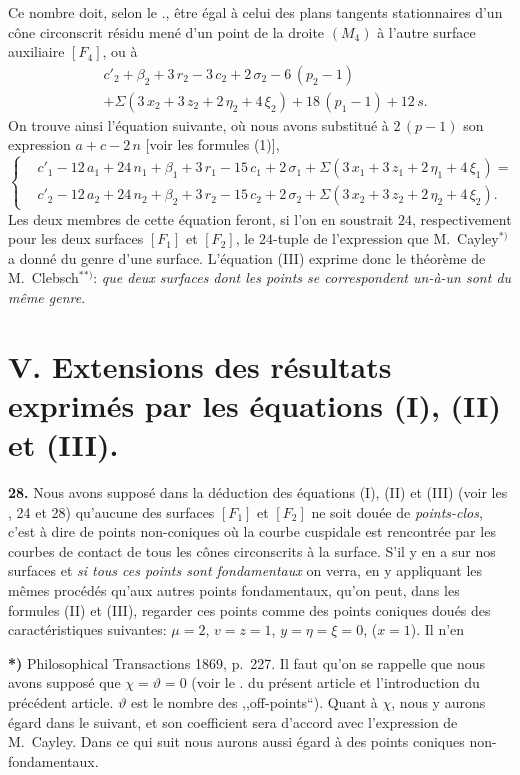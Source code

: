 \documentclass{article}
\begin{document}
Ce nombre doit, selon le ., être égal à celui des plans tangents stationnaires d'un cône circonscrit résidu mené d'un point de la droite $(M_4)$ à l'autre surface auxiliaire $[F_4]$, ou à
\[
\begin{aligned}
& c'_2 + \beta_2 + 3\,r_2 - 3\,c_2 + 2\,\sigma_2 - 6\,(p_2 - 1) \\
& + \Sigma(3\,x_2 + 3\,z_2 + 2\,\eta_2 + 4\,\xi_2) + 18\,(p_1 - 1) + 12\,s.
\end{aligned}
\]
On trouve ainsi l'équation suivante, où nous avons substitué à $2\,(p - 1)$ son expression $a + c - 2\,n$ [voir les formules (1)],
\[
\tag{III}
\left\{
\begin{aligned}
& c'_1 - 12\,a_1 + 24\,n_1 + \beta_1 + 3\,r_1 - 15\,c_1 + 2\,\sigma_1 + \Sigma(3\,x_1 + 3\,z_1 + 2\,\eta_1 + 4\,\xi_1) = \\
& c'_2 - 12\,a_2 + 24\,n_2 + \beta_2 + 3\,r_2 - 15\,c_2 + 2\,\sigma_2 + \Sigma(3\,x_2 + 3\,z_2 + 2\,\eta_2 + 4\,\xi_2).
\end{aligned}
\right.
\]
Les deux membres de cette équation feront, si l'on en soustrait $24$, respectivement pour les deux surfaces $[F_1]$ et $[F_2]$, le $24$-tuple de l'expression que M.~Cayley${}^{*)}$ a donné du genre d'une surface. L'équation (III) exprime donc le théorème de M.~Clebsch${}^{**)}$: \emph{que deux surfaces dont les points se correspondent un-à-un sont du même genre}.

\section*{V. Extensions des résultats exprimés par les équations (I), (II) et (III).}

\textbf{28.} Nous avons supposé dans la déduction des équations (I), (II) et (III) (voir les , 24 et 28) qu'aucune des surfaces $[F_1]$ et $[F_2]$ ne soit douée de \emph{points-clos}, c'est à dire de points non-coniques où la courbe cuspidale est rencontrée par les courbes de contact de tous les cônes circonscrits à la surface. S'il y en a sur nos surfaces et \emph{si tous ces points sont fondamentaux} on verra, en y appliquant les mêmes procédés qu'aux autres points fondamentaux, qu'on peut, dans les formules (II) et (III), regarder ces points comme des points coniques doués des caractéristiques suivantes: $\mu = 2$, $v = z = 1$, $y = \eta = \xi = 0$, ($x = 1$). Il n'en

\textbf{*)} Philosophical Transactions 1869, p.~227. Il faut qu'on se rappelle que nous avons supposé que $\chi = \vartheta = 0$ (voir le . du présent article et l'introduction du précédent article. $\vartheta$ est le nombre des ,,off-points``). Quant à $\chi$, nous y aurons égard dans le \no suivant, et son coefficient sera d'accord avec l'expression de M.~Cayley. Dans ce qui suit nous aurons aussi égard à des points coniques non-fondamentaux.
\end{document}
